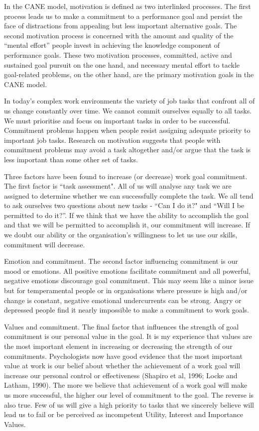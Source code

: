 In the CANE model, motivation is defined as two interlinked processes. The first process leads us to make a commitment to a performance goal and persist the face of distractions from appealing but less important alternative goals. The second motivation process is concerned with the amount and quality of the “mental effort” people invest in achieving the knowledge component of performance goals. These two motivation processes, committed, active and sustained goal pursuit on the one hand, and necessary mental effort to tackle goal-related problems, on the other hand, are the primary motivation goals in the CANE model.


In today’s complex work environments the variety of job tasks that confront all of us change constantly over time. We cannot commit ourselves equally to all tasks. We must prioritise and focus on important tasks in order to be successful. Commitment problems happen when people resist assigning adequate priority to important job tasks. Research on motivation suggests that people with commitment problems may avoid a task altogether and/or argue that the task is less important than some other set of tasks.

Three factors have been found to increase (or decrease) work goal commitment. The first factor is ``task assessment". All of us will analyse any task we are assigned to determine whether we can successfully complete the task. We all tend to ask ourselves two questions about new tasks - ``Can I do it?" and “Will I be permitted to do it?”. If we think that we have the ability to accomplish the goal and that we will be permitted to accomplish it, our commitment will increase. If we doubt our ability or the organisation’s willingness to let us use our skills, commitment will decrease.

Emotion and commitment. The second factor influencing commitment is our mood or emotions. All positive emotions facilitate commitment and all powerful, negative emotions discourage goal commitment. This may seem like a minor issue but for temperamental people or in organisations where pressure is high and/or change is constant, negative emotional undercurrents can be strong. Angry or depressed people find it nearly impossible to make a commitment to work goals.

Values and commitment. The final factor that influences the strength of goal commitment is our personal value in the goal. It is my experience that values are the most important element in increasing or decreasing the strength of our commitments. Psychologists now have good evidence that the most important value at work is our belief about whether the achievement of a work goal will increase our personal control or effectiveness (Shapiro et al, 1996; Locke and Latham, 1990). The more we believe that achievement of a work goal will make us more successful, the higher our level of commitment to the goal. The reverse is also true. Few of us will give a high priority to tasks that we sincerely believe will lead us to fail or be perceived as incompetent Utility, Interest and Importance Values.

